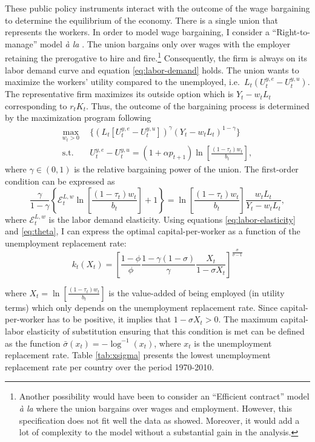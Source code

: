\documentclass[
]{article}
\begin{document}
These public policy instruments interact with the outcome of the wage bargaining to determine the equilibrium of the economy.
There is a single union that represents the workers. In order to model wage bargaining, I consider a ``Right-to-manage'' model \emph{à la} \citet{Nickell1983}. The union bargains only over wages with the employer retaining the prerogative to hire and fire.\footnote{Another possibility would have been to consider an ``Efficient contract'' model \emph{à la} \citet{McDonald1981} where the union bargains over wages and employment. However, this specification does not fit well the data as \citet{Bentolila2003} showed. Moreover, it would add a lot of complexity to the model without a substantial gain in the analysis.} Consequently, the firm is always on its labor demand curve and equation \eqref{eq:labor-demand} holds. The union wants to maximize the workers' utility compared to the unemployed, i.e.~\(L_t\left(U^{y,e}_t - U^{y,u}_t\right)\). The representative firm maximizes its outside option which is \(Y_t-w_tL_t\) corresponding to \(r_t K_t\). Thus, the outcome of the bargaining process is determined by the maximization program following
\begin{align*}
  \max_{w_t>0} ~~ &\lbrace \left(L_t[U^{y,e}_t - U^{y,u}_t]\right)^\gamma \left(Y_t-w_tL_t\right)^{1-\gamma}\rbrace\\
    \text{s.t.} ~~ &U_t^{y,e} - U_t^{y,u} = (1+\alpha p_{t+1})\ln\left[\frac{(1-\tau_t)w_t}{b_t}\right],
\end{align*}
where \(\gamma\in(0,1)\) is the relative bargaining power of the union. The first-order condition can be expressed as
\begin{equation*}
    \frac{\gamma}{1-\gamma}\left\lbrace\mathcal{E}^{L,w}_t\ln\left[\frac{(1-\tau_t)w_t}{b_t}\right]+1\right\rbrace = \ln\left[\frac{(1-\tau_t)w_t}{b_t}\right] \frac{w_tL_t}{Y_t-w_tL_t}, \label{eq:foc-wage-bargaining}
\end{equation*}
where \(\mathcal{E}^{L,w}_t\) is the labor demand elasticity. Using equations \eqref{eq:labor-elasticity} and \eqref{eq:theta}, I can express the optimal capital-per-worker as a function of the unemployment replacement rate:
\begin{equation}
    k_t(X_t) = \left[\frac{1-\phi}{\phi}\frac{1-\gamma(1-\sigma)}{\gamma}\frac{X_t}{1-\sigma X_t}\right]^{\frac{\sigma}{\sigma-1}} \label{eq:k-x}
\end{equation}

where \(X_t=\ln\left[\frac{(1-\tau_t)w_t}{b_t}\right]\) is the value-added of being employed (in utility terms) which only depends on the unemployment replacement rate. Since capital-per-worker has to be positive, it implies that \(1-\sigma X_t > 0\). The maximum capital-labor elasticity of substitution ensuring that this condition is met can be defined as the function \(\bar{\sigma}(x_t) = -\log^{-1}(x_t)\), where \(x_t\) is the unemployment replacement rate. Table \ref{tab:xsigma} presents the lowest unemployment replacement rate per country over the period 1970-2010.
\end{document}
